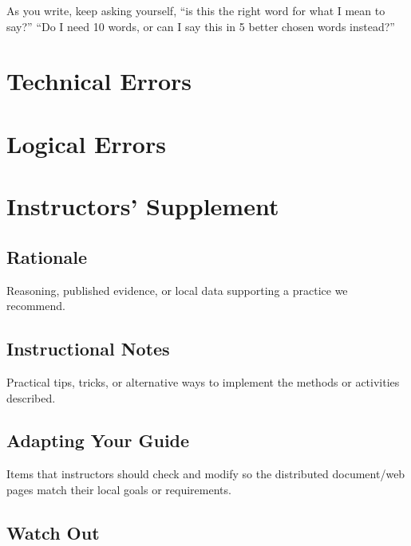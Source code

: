 \documentclass[
]{book}
\begin{document}
As you write, keep asking yourself, ``is this the right word for what I mean to say?'' ``Do I need 10 words, or can I say this in 5 better chosen words instead?''

\hypertarget{technical-errors}{%
\section{Technical Errors}\label{technical-errors}}

\hypertarget{logical-errors}{%
\section{Logical Errors}\label{logical-errors}}

\hypertarget{instructors-supplement-2}{%
\section{Instructors' Supplement}\label{instructors-supplement-2}}

\hypertarget{rationale}{%
\subsection{Rationale}\label{rationale}}

Reasoning, published evidence, or local data supporting a practice we recommend.

\hypertarget{instructional-notes}{%
\subsection{Instructional Notes}\label{instructional-notes}}

Practical tips, tricks, or alternative ways to implement the methods or activities described.

\hypertarget{adapting-your-guide-2}{%
\subsection{Adapting Your Guide}\label{adapting-your-guide-2}}

Items that instructors should check and modify so the distributed document/web pages match their local goals or requirements.

\hypertarget{watch-out}{%
\subsection{Watch Out}\label{watch-out}}
\end{document}
